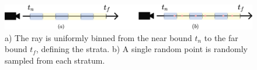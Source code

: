 \begin{figure}[h]
    \centering
    \includegraphics[width=1.0\textwidth]{figures/stratified-sampling.png}
    \caption[Stratified sampling]{a) The ray is uniformly binned from the near bound $t_n$ to the far bound $t_f$, defining the strata. b) A single random point is randomly sampled from each stratum.}
    \label{fig:stratified-sampling}
\end{figure}